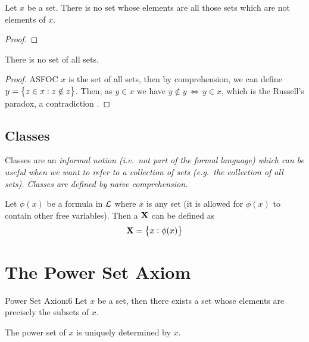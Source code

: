 \documentclass{styles/tufte}
\begin{document}
\begin{proposition}{}{}
  Let $x$ be a set. There is no set whose elements are all those sets which are not elements of $x$.
\end{proposition}
\begin{proof}
  
\end{proof}

\begin{theorem}{}{}
  There is no set of all sets.
\end{theorem}
\begin{proof}
  ASFOC $x$ is the set of all sets, then by comprehension, we can define $y = \set{z \in x: z \notin z}$. Then, as $y \in x$ we have $y \notin y \,\iff\, y \in x$, which is the Russell's paradox, a contradiction \contradiction.
\end{proof}


\subsection{Classes}
  
  Classes are an \em{informal} notion (i.e.~not part of the formal language) which can be useful when we want to refer to a collection of sets (e.g.~the collection of all sets). Classes are defined by naive comprehension.
  
  \begin{definition}{}{}
    Let $\phi(x)$ be a formula in $\mathcal{L}$ where $x$ is any set (it is allowed for $\phi(x)$ to contain other free variables). Then a  $\mathbf{X}$ can be defined as
    \[ \class{X} = \set{x: \phi(x)} \]
  \end{definition}



\section{The Power Set Axiom}

\begin{zf}{Power Set Axiom}{6}
  Let $x$ be a set, then there exists a set whose elements are precisely the subsets of $x$.
\end{zf}

\begin{theorem}{}{}
  The power set of $x$ is uniquely determined by $x$.
\end{theorem}
\end{document}
